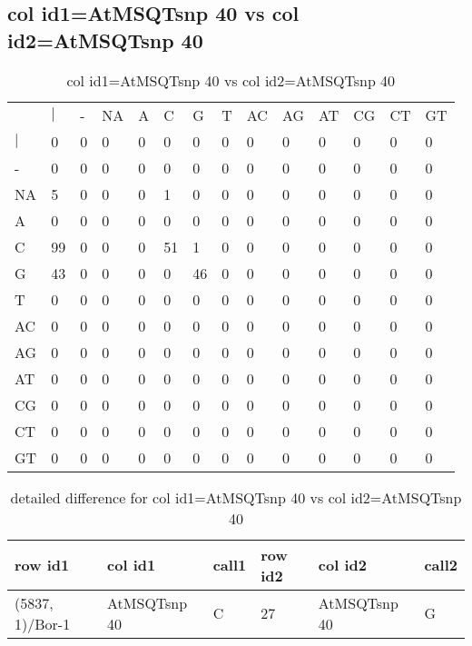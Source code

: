 \subsection{col id1=AtMSQTsnp 40 vs col id2=AtMSQTsnp 40}
\begin{center}
\begin{longtable}{|l|l|l|l|l|l|l|l|l|l|l|l|l|l|}
\caption{col id1=AtMSQTsnp 40 vs col id2=AtMSQTsnp 40} \label{table_dm724}\\
\hline
\\
\hline
&$|$&-&NA&A&C&G&T&AC&AG&AT&CG&CT&GT\\
$|$&0&0&0&0&0&0&0&0&0&0&0&0&0\\
-&0&0&0&0&0&0&0&0&0&0&0&0&0\\
NA&5&0&0&0&1&0&0&0&0&0&0&0&0\\
A&0&0&0&0&0&0&0&0&0&0&0&0&0\\
C&99&0&0&0&51&1&0&0&0&0&0&0&0\\
G&43&0&0&0&0&46&0&0&0&0&0&0&0\\
T&0&0&0&0&0&0&0&0&0&0&0&0&0\\
AC&0&0&0&0&0&0&0&0&0&0&0&0&0\\
AG&0&0&0&0&0&0&0&0&0&0&0&0&0\\
AT&0&0&0&0&0&0&0&0&0&0&0&0&0\\
CG&0&0&0&0&0&0&0&0&0&0&0&0&0\\
CT&0&0&0&0&0&0&0&0&0&0&0&0&0\\
GT&0&0&0&0&0&0&0&0&0&0&0&0&0\\
\hline
\end{longtable}
\end{center}

\begin{center}
\begin{longtable}{|l|l|l|l|l|l|}
\caption{detailed difference for col id1=AtMSQTsnp 40 vs col id2=AtMSQTsnp 40} \label{table_dm725}\\
\hline
row id1&col id1&call1&row id2&col id2&call2\\
\hline
(5837, 1)/Bor-1&AtMSQTsnp 40&C&27&AtMSQTsnp 40&G\\
\hline
\end{longtable}
\end{center}

